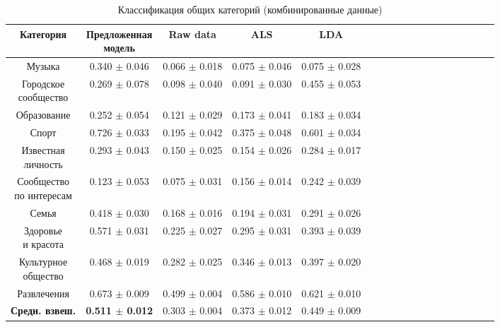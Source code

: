 \documentclass[times,specification,annotation]{itmo-student-thesis}
\begin{document}
\begin{table}[!h]
\caption{Классификация общих категорий (комбинированные данные)}\label{tab-combined-g}
\centering
\begin{tabular}{|*{18}{c|}}\hline
Категория & \thead{Предложенная \\  модель}  & Raw data & ALS & LDA \\\hline
Музыка         				    	& 0.340 $\pm$ 0.046 & 0.066 $\pm$ 0.018 & 0.075 $\pm$ 0.046 & 0.075 $\pm$ 0.028  \\\hline
\thead{Городское \\ сообщество}
                                      		& 0.269 $\pm$ 0.078 & 0.098 $\pm$ 0.040 & 0.091 $\pm$ 0.030 & 0.455 $\pm$ 0.053  \\\hline
Образование              		& 0.252 $\pm$ 0.054 & 0.121 $\pm$ 0.029 & 0.173 $\pm$ 0.041 & 0.183 $\pm$ 0.034  \\\hline
Спорт        							& 0.726 $\pm$ 0.033 & 0.195 $\pm$ 0.042 & 0.375 $\pm$ 0.048 & 0.601 $\pm$ 0.034  \\\hline
\thead{Известная \\ личность}
         							    	& 0.293 $\pm$ 0.043 & 0.150 $\pm$ 0.025 & 0.154 $\pm$ 0.026 & 0.284 $\pm$ 0.017  \\\hline
\thead{Сообщество \\ по интересам}
         									& 0.123 $\pm$ 0.053 & 0.075 $\pm$ 0.031 & 0.156 $\pm$ 0.014 & 0.242 $\pm$ 0.039  \\\hline
Семья  								& 0.418 $\pm$ 0.030 & 0.168 $\pm$ 0.016 & 0.194 $\pm$ 0.031 & 0.291 $\pm$ 0.026  \\\hline
\thead{Здоровье \\ и красота}
               							    & 0.571 $\pm$ 0.031 & 0.225 $\pm$ 0.027 & 0.295 $\pm$ 0.031 & 0.393 $\pm$ 0.039  \\\hline
\thead{Культурное \\ общество}
           									& 0.468 $\pm$ 0.019 & 0.282 $\pm$ 0.025 & 0.346 $\pm$ 0.013 & 0.397 $\pm$ 0.020  \\\hline
Развлечения           			& 0.673 $\pm$ 0.009 & 0.499 $\pm$ 0.004 & 0.586 $\pm$ 0.010 & 0.621 $\pm$ 0.010  \\\hline
\textbf{Средн. взвеш.}& \textbf{0.511 $\pm$ 0.012} & 0.303 $\pm$ 0.004 & 0.373 $\pm$ 0.012 & 0.449 $\pm$ 0.009  \\\hline
\end{tabular}
\end{table}
\end{document}
